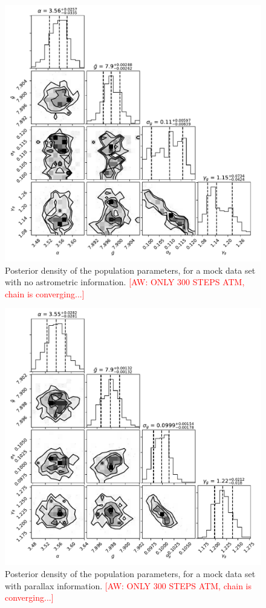 \documentclass[fleqn,usenatbib]{mnras}
\newcommand{\aw}[1]{\textcolor{red}{[AW: #1]}}
\begin{document}
\begin{figure}
	\includegraphics[width=.8\textwidth]{toy_chain_40-40.pdf}
    \caption{Posterior density of the population parameters, for a mock data set with no astrometric information. \aw{ONLY 300 STEPS ATM, chain is converging...}}
    \label{fig:chain}
\end{figure}

\begin{figure}
	\includegraphics[width=.8\textwidth]{toy_chain_include-parallax_40-40.pdf}
    \caption{Posterior density of the population parameters, for a mock data set with parallax information. \aw{ONLY 300 STEPS ATM, chain is converging...}}
    \label{fig:chain_parallax}
\end{figure}
\end{document}
